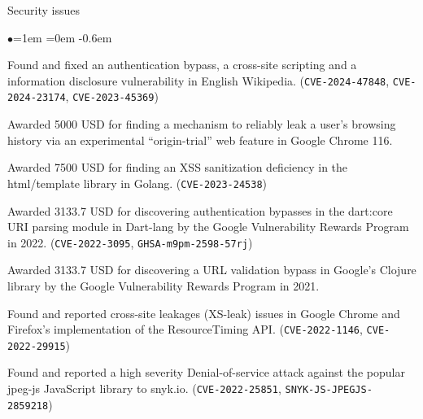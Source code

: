 \documentclass{resume} %
\begin{document}
\begin{rSection}{Security issues}
\begin{list}{$\bullet$}{\leftmargin=1em \itemindent=0em}
\itemsep -0.6em
\item Found and fixed an authentication bypass, a cross-site scripting and a information disclosure vulnerability in English Wikipedia. (\texttt{CVE-2024-47848}, \texttt{CVE-2024-23174}, \texttt{CVE-2023-45369})
\item Awarded 5000 USD for finding a mechanism to reliably leak a user's browsing history via an experimental ``origin-trial'' web feature in Google Chrome 116.
\item Awarded 7500 USD for finding an XSS sanitization deficiency in the html/template library in Golang. (\texttt{CVE-2023-24538})
\item Awarded 3133.7 USD for discovering authentication bypasses in the dart:core URI parsing module in Dart-lang by the Google Vulnerability Rewards Program in 2022. (\texttt{CVE-2022-3095}, \texttt{GHSA-m9pm-2598-57rj})
\item Awarded 3133.7 USD for discovering a URL validation bypass in Google's Clojure library by the Google Vulnerability Rewards Program in 2021.
\item Found and reported cross-site leakages (XS-leak) issues in Google Chrome and Firefox's implementation of the ResourceTiming API. (\texttt{CVE-2022-1146}, \texttt{CVE-2022-29915})
\item Found and reported a high severity Denial-of-service attack against the popular jpeg-js JavaScript library to snyk.io.
\linebreak(\texttt{CVE-2022-25851}, \texttt{SNYK-JS-JPEGJS-2859218})
\end{list}
\end{rSection}
\end{document}
